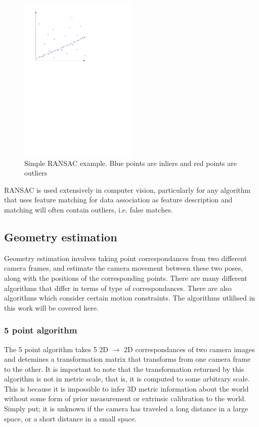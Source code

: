 \begin{figure}[h]
  \centering
    \includegraphics[width=0.5\textwidth]{chapters/images/ransac}
  \caption{Simple RANSAC example.  Blue points are inliers and red points are outliers}
  \label{fig:RANSAC}
\end{figure}

RANSAC is used extensively in computer vision, particularly for any algorithm that uses feature matching for data association as feature description and matching will often contain outliers, i.e. false matches.

\subsection{Geometry estimation}

Geometry estimation involves taking point correspondances from two different camera frames, and estimate the camera movement between these two poses, along with the positions of the corresponding points.  There are many different algorithms that differ in terms of type of correspondances.  There are also algorithms which consider certain motion constraints.  The algorithms utlilised in this work will be covered here.

\subsubsection{5 point algorithm}
\label{subsec:5point}

The 5 point algorithm\cite{nister_04} takes 5 2D $\rightarrow$ 2D correspondances of two camera images and detemines a transformation matrix that transforms from one camera frame to the other. It is important to note that the transformation returned by this algorithm is not in metric scale, that is, it is computed to some arbitrary scale.  This is because it is impossible to infer 3D metric information about the world without some form of prior measurement or extrinsic calibration to the world.  Simply put; it is unknown if the camera has traveled a long distance in a large space, or a short distance in a small space.

